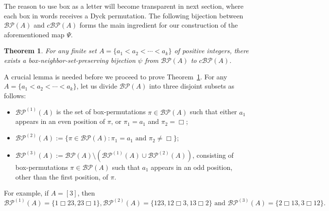 \documentclass[12pt]{amsart}
\numberwithin{equation}{section}
\theoremstyle{plain}
\newtheorem{theorem}{Theorem}[section]
\theoremstyle{definition}
\newcommand{\BP}{\mathcal{BP}}
\newcommand{\cBP}{c\mathcal{BP}}
\begin{document}
The reason to use box as a letter will become transparent in next section, where each box in words receives a Dyck permutation. 
The following bijection between $\BP(A)$ and $\cBP(A)$ forms the main ingredient for our construction of the aforementioned map $\Psi$. 
\begin{theorem}\label{thm:box}
For any finite set $A=\{a_1<a_2<\cdots<a_k\}$ of positive integers,
there exists a box-neighbor-set-preserving bijection $\psi$ from $\BP(A)$ to $\cBP(A)$.
\end{theorem}

A crucial lemma is needed before we proceed to prove Theorem~\ref{thm:box}. For any $A=\{a_1<a_2<\cdots<a_k\}$, let us divide $\BP(A)$ into three disjoint subsets as follows:
\begin{itemize}
\item $\BP^{(1)}(A)$ is the set of box-permutations $\pi\in\BP(A)$ such that either $a_1$ appears in an even position of $\pi$, or $\pi_1=a_1$ and $\pi_2=\Box$;
\item $\BP^{(2)}(A):=\{\pi\in\BP(A): \pi_1=a_1\text{ and  $\pi_2\neq\Box$}\}$; 
\item $\BP^{(3)}(A):=\BP(A)\setminus(\BP^{(1)}(A)\cup\BP^{(2)}(A))$, consisting of box-permutations $\pi\in\BP(A)$ such that  $a_1$ appears in an odd position, other than the first position, of $\pi$.
\end{itemize}
For example, if $A=[3]$, then 
$$
\BP^{(1)}(A)=\{1\Box23,23\Box1\}, \BP^{(2)}(A)=\{123,12\Box3,13\Box2\} \text{ and }\BP^{(3)}(A)=\{2\Box13,3\Box12\}.
$$
\end{document}
